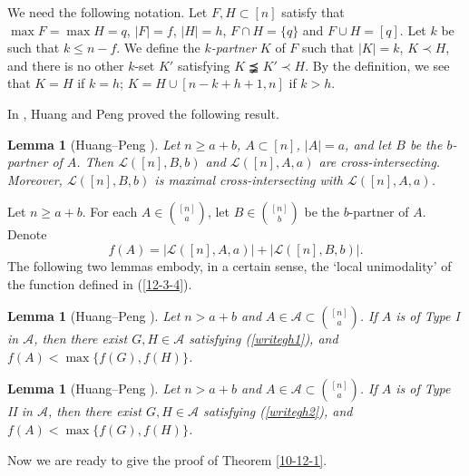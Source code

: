 \documentclass[11pt]{article}
\def\marrow{{\boldmath {\marginpar[\hfill$\rightarrow \rightarrow$]{$\leftarrow \leftarrow$}}}}
\def\andrey#1{{\sc Andrey: }{\marrow\sf \textcolor{blue}{#1}}}
\newcommand{\m}{\mathcal}
\newtheorem{lemma}[theorem]{Lemma}
\begin{document}
We need the following notation.
Let $F, H \subset [n]$ satisfy that $\max F=\max H=q$, $|F|=f$, $|H|=h$, $F\cap H=\{q\}$ and $F\cup H=[q]$. Let $k$ be such that $k\leq n-f$. 
We define the {\it $k$-partner} $K$ of $F$ such that $|K|=k$, $K\prec H$, and there is no other $k$-set $K'$ satisfying $K\precneqq K'\prec H$. By the definition, we see that $K=H$ if $k=h$; $K= H\cup [n-k+h+1, n]$ if $k>h$. 

In \cite{k_1+k_3}, Huang and Peng proved the following result. 
 
 
\begin{lemma}[Huang--Peng \cite{k_1+k_3}]\label{3-12-1}
Let $n\ge a+b$, $A\subset [n]$, $|A|=a$, and let $B$ be the $b$-partner of $A$. Then
$\mathcal{L}([n], B, b)$ and $\mathcal{L}([n], A, a)$ are cross-intersecting. Moreover, $\mathcal{L}([n], B, b)$ is maximal cross-intersecting with $\mathcal{L}([n], A, a)$.
\end{lemma}



Let $n\ge a+b$. For each $A\in {[n]\choose a}$, let $B\in {[n]\choose b}$ be the $b$-partner of $A$. Denote
\begin{equation}\label{12-3-4}
f(A)=|\mathcal{L}([n], A, a)|+|\mathcal{L}([n], B, b)|.
\end{equation}
The following two lemmas embody, in a certain sense, the `local unimodality' of the function defined in (\ref{12-3-4}).
\begin{lemma}[Huang--Peng \cite{12-3-1}]\label{clm28}
Let $n> a+b$ and $A\in \m A\subset {[n]\choose a}$. If $A$ is of Type I in $\m A$, then there exist $G, H\in \m A$ satisfying (\ref{writegh1}), and $f(A)<\max \{f(G), f(H)\}$.
\end{lemma}

\begin{lemma}[Huang--Peng \cite{12-3-1}]\label{clm29}
Let $n> a+b$ and $A\in \m A\subset {[n]\choose a}$. If $A$ is of Type II in $\m A$, then there exist $G, H\in \m A$ satisfying (\ref{writegh2}), and $f(A)<\max \{f(G), f(H)\}$.
\end{lemma}

Now we are ready to give the proof of Theorem \ref{10-12-1}.
\end{document}
